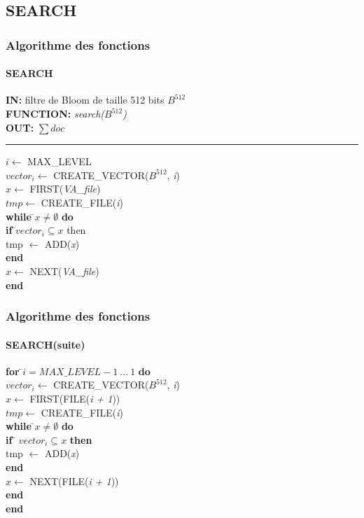 \documentclass[hyperref={pdfpagemode=FullScreen,colorlinks=true},xcolor=pst,dvips]{beamer}\usepackage[french]{babel}
\begin{document}
	\subsection{SEARCH}
	\begin{frame}[shrink]
		\frametitle{Algorithme des fonctions}
		\framesubtitle{SEARCH}
		\begin{framed}
			\textbf{IN:} filtre de Bloom de taille 512 bits $B^{512}$\\
			\textbf{FUNCTION:} \textit{search($B^{512}$)}\\
			\textbf{OUT:} \textit{$\sum doc$}\\

			\noindent\rule{\linewidth}{0.5pt}

			\begin{tabbing}
				$i \leftarrow$ MAX\_LEVEL\\
				$vector_i \leftarrow$ CREATE\_VECTOR($B^{512}$, \textit{i})\\
				$x \leftarrow$ FIRST(\textit{VA\_file})\\
				$tmp \leftarrow$ CREATE\_FILE(\textit{i})\\
			
				\textbf{while }\=$x \neq \emptyset $ \textbf{do}\\
					\> \textbf{if }\=$vector_i \subseteq x$ {then}\\
					\>\> tmp $\leftarrow$ ADD(\textit{x})\\
					\> \textbf{end}\\
					\> $x \leftarrow$ NEXT(\textit{VA\_file})\\
				\textbf{end}\\
	    		\end{tabbing}		
		\end{framed}
	\end{frame}
	
	\begin{frame}[shrink]
		\frametitle{Algorithme des fonctions}
		\framesubtitle{SEARCH(suite)}
		\begin{framed}
			\begin{tabbing}
				\textbf{for }\=$i = MAX\_LEVEL - 1\ ...\ 1$ \textbf{do}\\
					\> $vector_i \leftarrow$ CREATE\_VECTOR($B^{512}$, \textit{i})\\
					\> $x \leftarrow$ FIRST(FILE(\textit{i + 1}))\\
					\> $tmp \leftarrow$ CREATE\_FILE(\textit{i})\\
					\> \textbf{while }\=$x \neq \emptyset$\textbf{ do}\\
					\> \> \textbf{if }\= $vector_i \subseteq x$\textbf{ then}\\
					\> \> \> tmp $\leftarrow$ ADD(\textit{x})\\
					\> \> \textbf{end}\\
					\> \> $x \leftarrow$ NEXT(FILE(\textit{i + 1}))\\
					\> \textbf{end}\\
				\textbf{end}	\\
			\end{tabbing}
		\end{framed}
	\end{frame}
	
\end{document}
